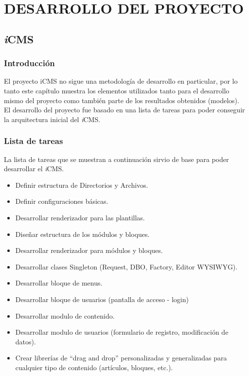 \part{DESARROLLO DEL PROYECTO}

\chapter{\textit{i}CMS}
\newpage
\section{Introducci\'on}
El proyecto iCMS no sigue una metodolog\'ia de desarrollo en particular, por lo tanto este cap\'itulo muestra los elementos utilizados tanto para el desarrollo mismo del proyecto como tambi\'en parte de los resultados obtenidos (modelos).\\

El desarrollo del proyecto fue basado en una lista de tareas para poder conseguir la arquitectura inicial del \textit{i}CMS.\\

\section{Lista de tareas}
La lista de tareas que se muestran a continuaci\'on sirvio de base para poder desarrollar el \textit{i}CMS.

\begin{itemize}
\item Definir estructura de Directorios y Archivos.
\item Definir configuraciones b\'asicas.
\item Desarrollar renderizador para las plantillas.
\item Dise\~nar estructura de los m\'odulos y bloques.
\item Desarrollar renderizador para m\'odulos y bloques.
\item Desarrollar clases Singleton (Request, DBO, Factory, Editor WYSIWYG).
\item Desarrollar bloque de menus.
\item Desarrollar bloque de usuarios (pantalla de acceso - login)
\item Desarrollar modulo de contenido.
\item Desarrollar modulo de usuarios (formulario de registro, modificación de datos).
\item Crear librerías de “drag and drop” personalizadas y generalizadas para cualquier tipo de contenido (artículos, bloques, etc.).
\end{itemize}

